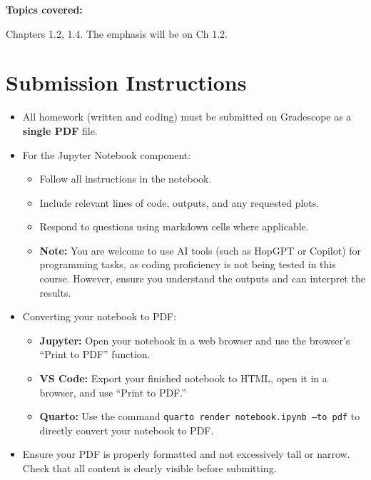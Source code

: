 \documentclass[reqno]{exam}
\begin{document}
\textbf{Topics covered:} 

Chapters 1.2, 1.4. The emphasis will be on Ch 1.2.


\section*{Submission Instructions}

\begin{itemize}
  \item All homework (written and coding) must be submitted on Gradescope as a \textbf{single PDF} file.

  \item For the Jupyter Notebook component:
        \begin{itemize}
          \item Follow all instructions in the notebook.
          \item Include relevant lines of code, outputs, and any requested plots.
          \item Respond to questions using markdown cells where applicable.
          \item \textbf{Note:} You are welcome to use AI tools (such as HopGPT or Copilot) for programming tasks, as coding proficiency is not being tested in this course. However, ensure you understand the outputs and can interpret the results.
        \end{itemize}

  \item Converting your notebook to PDF:
        \begin{itemize}
          \item \textbf{Jupyter:} Open your notebook in a web browser and use the browser's ``Print to PDF'' function.

          \item \textbf{VS Code:} Export your finished notebook to HTML, open it in a browser, and use ``Print to PDF.''

          \item \textbf{Quarto:} Use the command \texttt{quarto render notebook.ipynb --to pdf} to directly convert your notebook to PDF.
        \end{itemize}

  \item Ensure your PDF is properly formatted and not excessively tall or narrow. Check that all content is clearly visible before submitting.
\end{itemize}
\end{document}
